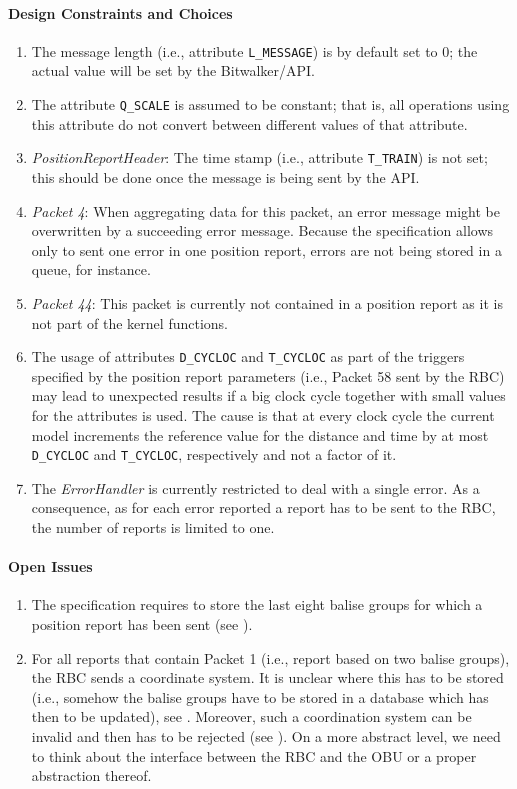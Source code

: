 \paragraph{Design Constraints and Choices}
\begin{enumerate}
	\item The message length (i.e., attribute \verb+L_MESSAGE+) is by default set to 0; the actual value will be set by the Bitwalker/API.
	\item The attribute \verb+Q_SCALE+ is assumed to be constant; that is, all operations using this attribute do not convert between different values of that attribute.
	\item \textit{PositionReportHeader}: The time stamp (i.e., attribute \verb+T_TRAIN+) is not set; this should be done once the message is being sent by the API.
	\item \textit{Packet 4}: When aggregating data for this packet, an error message might be overwritten by a succeeding error message. Because the specification allows only to sent one error in one position report, errors are not being stored in a queue, for instance.
	\item \textit{Packet 44}: This packet is currently not contained in a position report as it is not part of the kernel functions.
	\item The usage of attributes \verb+D_CYCLOC+ and \verb+T_CYCLOC+ as part of the triggers specified by the position report parameters (i.e., Packet 58 sent by the RBC) may lead to unexpected results if a big clock cycle together with small values for the attributes is used. The cause is that at every clock cycle the current model increments the reference value for the distance and time by at most \verb+D_CYCLOC+ and \verb+T_CYCLOC+, respectively and not a factor of it.
	\item The \textit{ErrorHandler} is currently restricted to deal with a single error. As a consequence, as for each error reported a report has to be sent to the RBC, the number of reports is limited to one.
\end{enumerate}

\paragraph{Open Issues}
\begin{enumerate}
	\item The specification requires to store the last eight balise groups for which a position report has been sent (see \cite[Chapter~3.6.2.2.2.c]{subset-026}).
	\item For all reports that contain Packet 1 (i.e., report based on two balise groups), the RBC sends a coordinate system. It is unclear where this has to be stored (i.e., somehow the balise groups have to be stored in a database which has then to be updated), see \cite[Chapter~3.4.2.3.3.6]{subset-026}. Moreover, such a coordination system can be invalid and then has to be rejected (see \cite[Chapter~3.4.2.3.3.7-8]{subset-026}). On a more abstract level, we need to think about the interface between the RBC and the OBU or a proper abstraction thereof.
\end{enumerate}
